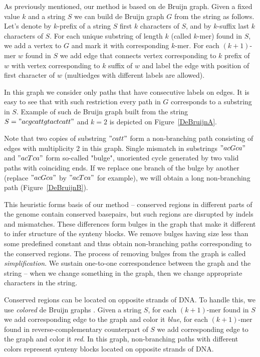 \documentclass[a4paper, 12pt]{scrartcl}
\begin{document}
As previously mentioned, our method is based on de Bruijn graph.
Given a fixed value \(k\) and a string \(S\) we can build de Bruijn graph \(G\) from the string as follows.
Let's denote by \(k\)-prefix of a string \(S\) first \(k\) characters of \(S\), and by \(k\)-suffix last \(k\) characters of \(S\).
For each unique substring of length \(k\) (called \(k\)-mer) found in \(S\), we add a vertex to \(G\) and mark it with
corresponding \(k\)-mer. For each \((k + 1)\)-mer \(w\) found in \(S\) we add edge that connects vertex corresponding to
\(k\) prefix of \(w\) with vertex corresponding to \(k\) suffix of \(w\) and label the edge with position of first character of \(w\)
(multiedges with different labels are allowed).

In this graph we consider only paths that have consecutive labels on edges. It is easy to see that with such restriction every path in \(G\)
corresponds to a substring in \(S\). Example of such de Bruijn graph built from the string \(S = "acgcattgtactcatt" \) and \(k = 2\) is
depicted on Figure~\ref{DeBruijnA}.

Note that two copies of substring \("catt"\) form a non-branching path consisting of edges with multiplicity \(2\) in this graph. Single
mismatch in substrings \("acGca"\) and \("acTca"\) form so-called "bulge", unoriented cycle generated by two valid paths with
coinciding ends. If we replace one branch of the bulge by another (replace \("acGca"\) by \("acTca"\) for example), we will obtain
a long non-branching path (Figure~\ref{DeBruijnB}).

This heuristic forms basis of our method -- conserved regions in different parts of the genome contain conserved basepairs, but
such regions are disrupted by indels and mismatches. These differences form bulges in the graph that make it different to infer
structure of the synteny blocks. We remove bulges having size less than some predefined constant and thus obtain non-branching
paths corresponding to the conserved regions. The process of removing bulges from the graph is called \textit{simplification}. We
sustain one-to-one correspondence between the graph and the string -- when we change something in the graph, then we change
appropriate characters in the string.

Conserved regions can be located on opposite strands of DNA. To handle this, we use \textit{colored} de Bruijn graphs \cite{Iqbal2012}.
Given a string \(S\), for each \((k + 1)\)-mer found in \(S\) we add corresponding edge to the graph and color it \textit{blue}, for 
each \((k + 1)\)-mer found in reverse-complementary counterpart of \(S\) we add corresponding edge to the graph and color it \textit{red}.
In this graph, non-branching paths with different colors represent synteny blocks located on opposite strands of DNA.
\end{document}
